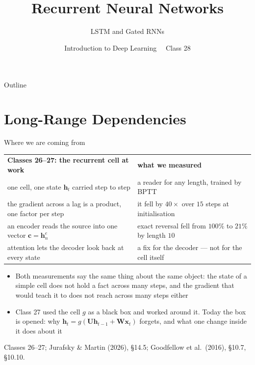 \documentclass[aspectratio=169, 11pt]{beamer}
\title{Recurrent Neural Networks}
\subtitle{LSTM and Gated RNNs}
\author{Introduction to Deep Learning \ \textperiodcentered\ Class 28}
\institute{}
\date{}
\newcommand{\srcline}[1]{%
  \par\vspace{0.25em}%
  {\scriptsize\color{mcMuted}\hfill #1\par}}
\newcommand{\src}[3]{}      %
\newcommand{\nosrc}{}       %
\begin{document}
\maketitle

\begin{frame}{Outline}
  \nosrc
  \tableofcontents
\end{frame}

\section{Long-Range Dependencies}

\begin{frame}{Where we are coming from}
  \src{jurafsky_slp3}{section}{14.5}
  \src{goodfellow2016}{section}{10.7}
  \vspace{-0.3em}
  {\scriptsize
  \renewcommand{\arraystretch}{1.3}
  \begin{tabular}{@{}l@{\hspace{1.2em}}l@{}}
    \textbf{Classes 26--27: the recurrent cell at work} & \textbf{what we measured}\\
    one cell, one state $\mathbf{h}_t$ carried step to step & a reader for any length, trained by BPTT\\
    the gradient across a lag is a product, one factor per step & it fell by $40\times$ over $15$ steps at initialisation\\
    an encoder reads the source into one vector $\mathbf{c} = \mathbf{h}^e_n$ & exact reversal fell from $100\%$ to $21\%$ by length $10$\\
    attention lets the decoder look back at every state & a fix for the decoder --- not for the cell itself\\
  \end{tabular}}
  \vspace{0.4em}

  {\footnotesize
  \begin{itemize}\itemsep0.2em
    \item Both measurements say the same thing about the same object:
          the state of a simple cell does not \alert{hold a fact} across
          many steps, and the gradient that would teach it to does not
          \alert{reach} across many steps either
    \item Class 27 used the cell $g$ as a black box and worked around it.
          Today the box is opened: why $\mathbf{h}_t = g(\mathbf{U}\mathbf{h}_{t-1} + \mathbf{W}\mathbf{x}_t)$
          forgets, and what one change inside it does about it
  \end{itemize}}
  \srcline{Classes 26--27; Jurafsky \& Martin (2026), \S14.5; Goodfellow et al.\ (2016), \S10.7, \S10.10.}
\end{frame}
\end{document}
